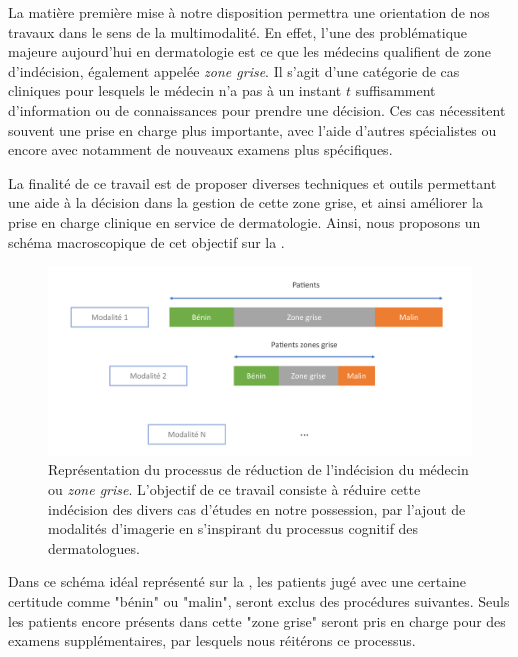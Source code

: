 La matière première mise à notre disposition permettra une orientation de nos travaux dans le sens de la multimodalité. En effet, l'une des problématique majeure aujourd'hui en dermatologie est ce que les médecins qualifient de zone d'indécision, également appelée \textit{zone grise}. Il s'agit d'une catégorie de cas cliniques pour lesquels le médecin n'a pas à un instant $t$ suffisamment d'information ou de connaissances pour prendre une décision. Ces cas nécessitent souvent une prise en charge plus importante, avec l'aide d'autres spécialistes ou encore avec notamment de nouveaux examens plus spécifiques.\par

La finalité de ce travail est de proposer diverses techniques et outils permettant une aide à la décision dans la gestion de cette zone grise, et ainsi améliorer la prise en charge clinique en service de dermatologie. Ainsi, nous proposons un schéma macroscopique de cet objectif sur la .\par

\begin{figure}[H]
    \centering
    \includegraphics[width=\linewidth]{contents/i_introduction/resources/scheme_reduce_indecision.pdf}
    \caption{Représentation du processus de réduction de l'indécision du médecin ou \textit{zone grise}. L'objectif de ce travail consiste à réduire cette indécision des divers cas d'études en notre possession, par l'ajout de modalités d'imagerie en s'inspirant du processus cognitif des dermatologues.}
    \label{fig:scheme_reduce_indecision}
\end{figure}\par

Dans ce schéma idéal représenté sur la , les patients jugé avec une certaine certitude comme "bénin" ou "malin", seront exclus des procédures suivantes. Seuls les patients encore présents dans cette "zone grise" seront pris en charge pour des examens supplémentaires, par lesquels nous réitérons ce processus.\par 

